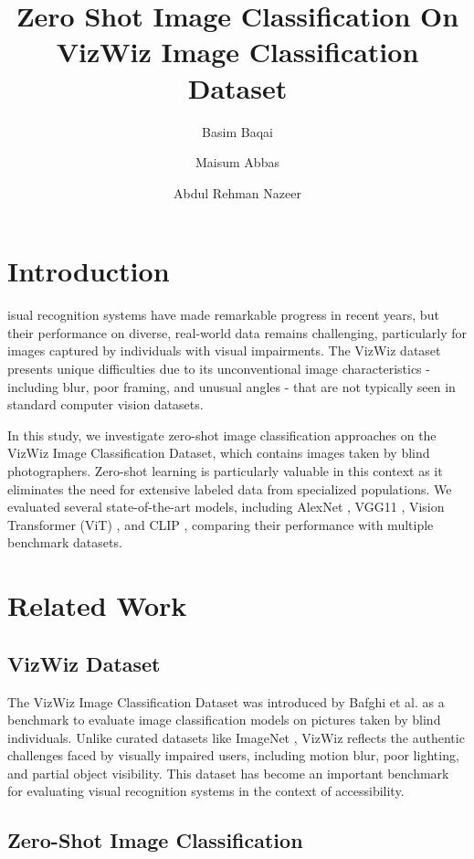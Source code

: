 \documentclass[9pt,a4paper,twocolumn,twoside]{tau-class/tau}
\title{Zero Shot Image Classification On VizWiz Image Classification Dataset}
\author[a]{Basim Baqai}
\author[a]{Maisum Abbas}
\author[a]{Abdul Rehman Nazeer}
\affil[a]{Department of Artificial Intelligence}
\begin{document}
\maketitle
\thispagestyle{firststyle}
\tauabstract
\section{Introduction}
isual recognition systems have made remarkable progress in recent years, but their performance on diverse, real-world data remains challenging, particularly for images captured by individuals with visual impairments. The VizWiz dataset \cite{Bafghi2023} presents unique difficulties due to its unconventional image characteristics - including blur, poor framing, and unusual angles - that are not typically seen in standard computer vision datasets.

In this study, we investigate zero-shot image classification approaches on the VizWiz Image Classification Dataset, which contains images taken by blind photographers. Zero-shot learning is particularly valuable in this context as it eliminates the need for extensive labeled data from specialized populations. We evaluated several state-of-the-art models, including AlexNet \cite{AlexNet}, VGG11 \cite{VGG}, Vision Transformer (ViT) \cite{ViT}, and CLIP \cite{CLIP}, comparing their performance with multiple benchmark datasets.

\section{Related Work}
\subsection{VizWiz Dataset}

The VizWiz Image Classification Dataset was introduced by Bafghi et al. \cite{Bafghi2023} as a benchmark to evaluate image classification models on pictures taken by blind individuals. Unlike curated datasets like ImageNet \cite{ImageNet}, VizWiz reflects the authentic challenges faced by visually impaired users, including motion blur, poor lighting, and partial object visibility. This dataset has become an important benchmark for evaluating visual recognition systems in the context of accessibility.

\subsection{Zero-Shot Image Classification}
\end{document}
